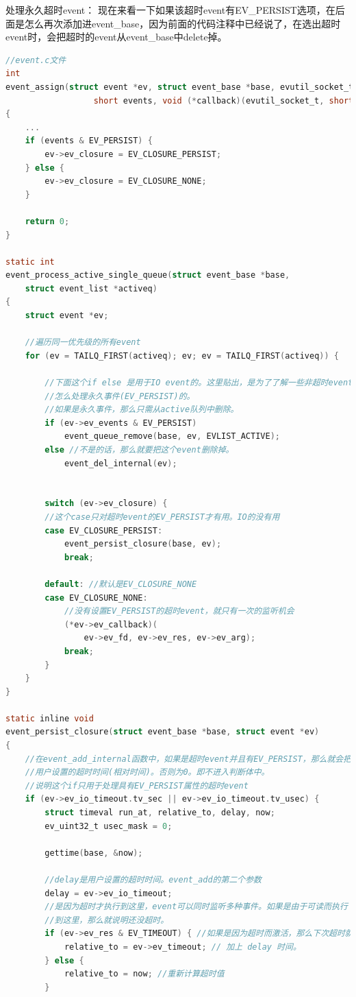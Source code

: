 \documentclass[11pt,a4paper]{article}
\begin{document}
处理永久超时event：
        现在来看一下如果该超时event有EV\_PERSIST选项，在后面是怎么再次添加进event\_base，因为前面的代码注释中已经说了，在选出超时event时，会把超时的event从event\_base中delete掉。
\begin{lstlisting}[language=C]
//event.c文件
int
event_assign(struct event *ev, struct event_base *base, evutil_socket_t fd, 
			      short events, void (*callback)(evutil_socket_t, short, void *), void *arg)
{
	...
	if (events & EV_PERSIST) {
		ev->ev_closure = EV_CLOSURE_PERSIST;
	} else {
		ev->ev_closure = EV_CLOSURE_NONE;
	}
	
	return 0;
}

static int
event_process_active_single_queue(struct event_base *base,
    struct event_list *activeq)
{
	struct event *ev;

	//遍历同一优先级的所有event
	for (ev = TAILQ_FIRST(activeq); ev; ev = TAILQ_FIRST(activeq)) {

		//下面这个if else 是用于IO event的。这里贴出，是为了了解一些非超时event是
		//怎么处理永久事件(EV_PERSIST)的。
		//如果是永久事件，那么只需从active队列中删除。
		if (ev->ev_events & EV_PERSIST)
			event_queue_remove(base, ev, EVLIST_ACTIVE);
		else //不是的话，那么就要把这个event删除掉。
			event_del_internal(ev);
		

		switch (ev->ev_closure) {
		//这个case只对超时event的EV_PERSIST才有用。IO的没有用
		case EV_CLOSURE_PERSIST:
			event_persist_closure(base, ev);
			break;
			
		default: //默认是EV_CLOSURE_NONE
		case EV_CLOSURE_NONE:
			//没有设置EV_PERSIST的超时event，就只有一次的监听机会
			(*ev->ev_callback)(
				ev->ev_fd, ev->ev_res, ev->ev_arg);
			break;
		}
	}
}

static inline void
event_persist_closure(struct event_base *base, struct event *ev)
{
	//在event_add_internal函数中，如果是超时event并且有EV_PERSIST，那么就会把ev_io_timeout设置成
	//用户设置的超时时间(相对时间)。否则为0。即不进入判断体中。
	//说明这个if只用于处理具有EV_PERSIST属性的超时event
	if (ev->ev_io_timeout.tv_sec || ev->ev_io_timeout.tv_usec) {
		struct timeval run_at, relative_to, delay, now;
		ev_uint32_t usec_mask = 0;

		gettime(base, &now);
 
		//delay是用户设置的超时时间。event_add的第二个参数
		delay = ev->ev_io_timeout;
		//是因为超时才执行到这里，event可以同时监听多种事件。如果是由于可读而执行
		//到这里，那么就说明还没超时。
		if (ev->ev_res & EV_TIMEOUT) { //如果是因为超时而激活，那么下次超时就是本次超时的
			relative_to = ev->ev_timeout; // 加上 delay 时间。
		} else {
			relative_to = now; //重新计算超时值
		}
		

\end{lstlisting}
\end{document}
